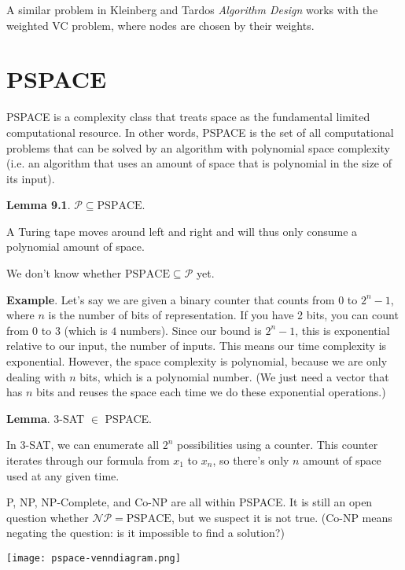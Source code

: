\documentclass{article}
\begin{document}
A similar problem in Kleinberg and Tardos \textit{Algorithm Design} works with the weighted VC problem, where nodes are chosen by their weights.

\section{PSPACE}
PSPACE is a complexity class that treats space as the fundamental limited computational resource. In other words, PSPACE is the set of all computational problems that can be solved by an algorithm with polynomial space complexity (i.e. an algorithm that uses an amount of space that is polynomial in the size of its input).

\textbf{Lemma 9.1}. $\mathcal{P} \subseteq \mathrm{PSPACE}$.

A Turing tape moves around left and right and will thus only consume a polynomial amount of space.

We don't know whether $\mathrm{PSPACE} \subseteq \mathcal{P}$ yet.

\textbf{Example}. Let's say we are given a binary counter that counts from $0$ to $2^n - 1$, where $n$ is the number of bits of representation. If you have 2 bits, you can count from $0$ to $3$ (which is $4$ numbers). Since our bound is $2^n - 1$, this is exponential relative to our input, the number of inputs. This means our time complexity is exponential. However, the space complexity is polynomial, because we are only dealing with $n$ bits, which is a polynomial number. (We just need a vector that has $n$ bits and reuses the space each time we do these exponential operations.)

\textbf{Lemma}. 3-SAT $\in$ PSPACE.

In 3-SAT, we can enumerate all $2^n$ possibilities using a counter. This counter iterates through our formula from $x_1$ to $x_n$, so there's only $n$ amount of space used at any given time.

P, NP, NP-Complete, and Co-NP are all within PSPACE. It is still an open question whether $\mathcal{NP} = \mathrm{PSPACE}$, but we suspect it is not true. (Co-NP means negating the question: is it impossible to find a solution?)

\texttt{[image: pspace-venndiagram.png]}
\end{document}
